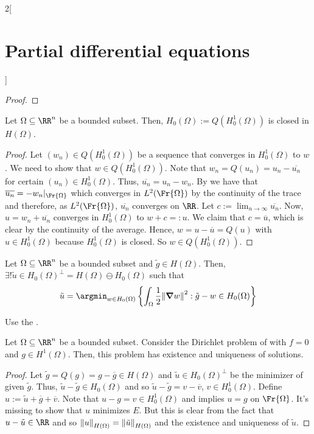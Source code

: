 \documentclass[../../../main_math.tex]{subfiles}
\begin{document}
\begin{multicols}{2}[\section{Partial differential equations}]
\begin{proof}
  \end{proof}
  \begin{proposition}
    Let $\Omega\subseteq \RR^n$ be a bounded subset. Then, $H_0(\Omega):=Q(H_0^1(\Omega))$ is closed in $H(\Omega)$.
  \end{proposition}
  \begin{proof}
    Let $(w_n)\in Q(H_0^1(\Omega))$ be a sequence that converges in $H_0^1(\Omega)$ to $w$. We need to show that $w\in Q(H_0^1(\Omega))$. Note that $w_n=Q(u_n)=u_n-\overline{u_n}$ for certain $(u_n)\in H_0^1(\Omega)$. Thus, $\overline{u_n} = u_n -w_n$. By  we have that $\overline{u_n} = -w_n|_{\Fr{\Omega}}$ which converges in $L^2(\Fr{\Omega})$ by the continuity of the trace and therefore, as $L^2(\Fr{\Omega})$, $\overline{u_n}$ converges on $\RR$. Let $\displaystyle c:=\lim_{n\to\infty}\overline{u_n}$. Now, $u=w_n+\overline{u_n}$ converges in $H_0^1(\Omega)$ to $w+c=:u$. We claim that $c=\overline{u}$, which is clear by the continuity of the average. Hence, $w=u-\overline{u} =Q(u)$ with $u\in H_0^1(\Omega)$ because $ H_0^1(\Omega)$ is closed. So $w\in Q(H_0^1(\Omega))$.
  \end{proof}
  \begin{proposition}\label{PDE:preexistence}
    Let $\Omega\subseteq \RR^n$ be a bounded subset and $\tilde{g}\in H(\Omega)$. Then, $\exists! \tilde{u}\in {H_0(\Omega)}^\perp=H(\Omega)\ominus H_0(\Omega)$ such that $$\tilde{u}=\argmin_{w\in H_0(\Omega)}\left\{\int_\Omega\frac{1}{2}\norm{\grad w}^2:\tilde{g}-w\in H_0(\Omega)\right\}$$
  \end{proposition}
  \begin{sproof}
    Use the .
  \end{sproof}
  \begin{theorem}
    Let $\Omega\subseteq \RR^n$ be a bounded subset. Consider the Dirichlet problem of  with $f=0$ and $g\in H^1(\Omega)$. Then, this problem has existence and uniqueness of solutions.
  \end{theorem}
  \begin{proof}
    Let $\tilde{g}=Q(g)=g-\overline{g}\in H(\Omega)$ and $\tilde{u}\in{H_0(\Omega)}^\perp$ be the minimizer of  given $\tilde{g}$. Thus, $\tilde{u}-\tilde{g}\in H_0(\Omega)$ and so $\tilde{u}-\tilde{g}=v-\overline{v}$, $v\in H_0^1(\Omega)$. Define $u:=\tilde{u}+\overline{g}+\overline{v}$. Note that $u-g=v\in H_0^1(\Omega)$ and  implies $u=g$ on $\Fr{\Omega}$. It's missing to show that $u$ minimizes $E$. But this is clear from the fact that $u-\tilde{u}\in\RR$ and so $\norm{u}_{H(\Omega)}=\norm{\tilde{u}}_{H(\Omega)}$ and the existence and uniqueness of $\tilde{u}$.
  \end{proof}
\end{multicols}
\end{document}
